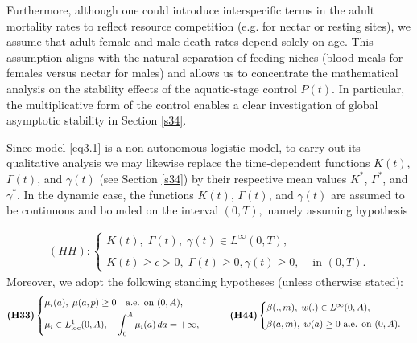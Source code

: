 \documentclass[10pt, a4paper]{amsart}
\newcounter{assu}
\theoremstyle{plain}
\theoremstyle{definition}
\theoremstyle{remark}
\numberwithin{equation}{section}
\newcommand{\K}{\mathbb{K}}
\begin{document}
Furthermore, although one could introduce interspecific terms in the adult mortality rates to reflect resource competition (e.g. for nectar or resting sites), we assume that adult female and male death rates depend solely on age.  This assumption aligns with the natural separation of feeding niches (blood meals for females versus nectar for males) and allows us to concentrate the mathematical analysis on the stability effects of the aquatic‐stage control $P(t)$.  In particular, the multiplicative form of the control enables a clear investigation of global asymptotic stability in Section \ref{s34}. 

Since model \eqref{eq3.1} is a non-autonomous logistic model, to carry out its qualitative analysis we may likewise replace the time-dependent functions $K(t)$, $\Gamma(t)$, and $\gamma(t)$ (see Section \ref{s34}) by their respective mean values $K^*$, $\Gamma^*$, and $\gamma^*$. In the dynamic case, the functions $K(t)$, $\Gamma(t)$, and $\gamma(t)$ are assumed to be continuous and bounded on the interval $(0,T),$ namely assuming hypothesis

\begin{align*}
(HH) : \begin{cases}
K(t),\; \Gamma(t),\; \gamma(t) \in L^{\infty}(0,T),\\
\\K(t)\ge \epsilon>0,\;\Gamma(t)\ge 0,\gamma(t)\ge 0, &\text{ in } (0,T).
\end{cases}
\end{align*}
Moreover, we adopt the following standing hypotheses (unless otherwise stated):
\begin{align*}
\textbf{(H33)}\begin{cases}
\mu_i(a),\; \mu(a,p)\geq 0 \quad \text{a.e. on }(0,A), \\[0.3em]
\mu_i \in L^1_{\rm loc}(0,A), \quad \displaystyle\int_0^{A}\mu_i(a)\,da = +\infty,
\end{cases}
\qquad
\textbf{(H44)}\begin{cases}
\beta(.,m),\; w(.) \in L^\infty(0,A),  \\[0.3em]
\beta(a,m),\; w(a)\ge 0 \ \text{a.e. on } (0,A).
\end{cases}
\end{align*}
\end{document}
